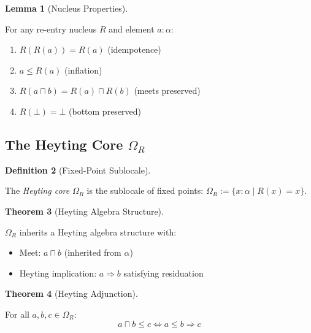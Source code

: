 \documentclass{amsart}
\theoremstyle{definition}
\newtheorem{definition}{Definition}[section]
\newtheorem{theorem}[definition]{Theorem}
\newtheorem{lemma}[definition]{Lemma}
\theoremstyle{remark}
\begin{document}
\begin{lemma}[Nucleus Properties]
\label{lem:nucleus-props}
\leanok
{}

For any re-entry nucleus $R$ and element $a : \alpha$:
\begin{enumerate}
\item $R(R(a)) = R(a)$ (idempotence)
\item $a \leq R(a)$ (inflation)
\item $R(a \sqcap b) = R(a) \sqcap R(b)$ (meets preserved)
\item $R(\bot) = \bot$ (bottom preserved)
\end{enumerate}
\end{lemma}

\subsection{The Heyting Core $\Omega_R$}
\label{sec:heyting-core}

\begin{definition}[Fixed-Point Sublocale]
\label{def:omega}

The \emph{Heyting core} $\Omega_R$ is the sublocale of fixed points: $\Omega_R := \{x : \alpha \mid R(x) = x\}$.
\end{definition}

\begin{theorem}[Heyting Algebra Structure]
\label{thm:heyting-instance}
\leanok
{}

$\Omega_R$ inherits a Heyting algebra structure with:
\begin{itemize}
\item Meet: $a \sqcap b$ (inherited from $\alpha$)
\item Heyting implication: $a \Rightarrow b$ satisfying residuation
\end{itemize}
\end{theorem}

\begin{theorem}[Heyting Adjunction]
\label{thm:heyting-adjunction}
\leanok
{}

For all $a, b, c \in \Omega_R$:
\[
a \sqcap b \leq c \iff a \leq b \Rightarrow c
\]
\end{theorem}
\end{document}

